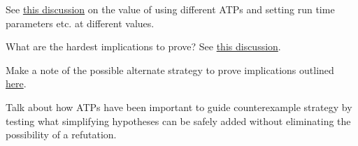 See \href{https://leanprover.zulipchat.com/#narrow/channel/458659-Equational/topic/1516.20-.3E.20255/near/481547543}{this discussion} on the value of using different ATPs and setting run time parameters etc. at different values.

What are the hardest implications to prove?  See \href{https://leanprover.zulipchat.com/#narrow/channel/458659-Equational/topic/What.20are.20the.20hardest.20positive.20implications.20for.20an.20ATP.3F}{this discussion}.

Make a note of the possible alternate strategy to prove implications outlined \href{https://leanprover.zulipchat.com/#narrow/stream/458659-Equational/topic/Ideas.20for.20unknown.20implications}{here}.

Talk about how ATPs have been important to guide counterexample strategy by testing what simplifying hypotheses can be safely added without eliminating the possibility of a refutation.
